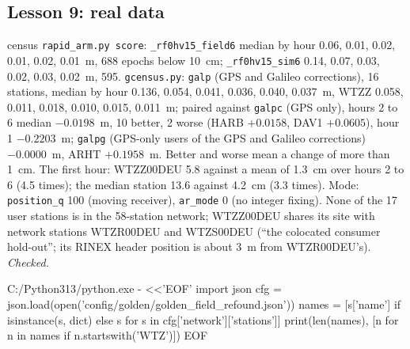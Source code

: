 \subsection*{Lesson 9: real data}

\begin{answer}{census}
\solution
\texttt{rapid\_arm.py score}: \texttt{\_rf0hv15\_field6} median by hour 0.06, 0.01, 0.02,
0.01, 0.02, 0.01~m, 688 epochs below 10~cm; \texttt{\_rf0hv15\_sim6} 0.14, 0.07, 0.03,
0.02, 0.03, 0.02~m, 595. \texttt{gcensus.py}: \texttt{galp} (GPS and Galileo
corrections), 16 stations, median by hour 0.136, 0.054, 0.041, 0.036, 0.040, 0.037~m,
WTZZ 0.058, 0.011, 0.018, 0.010, 0.015, 0.011~m; paired against \texttt{galpc} (GPS only),
hours 2 to 6 median $-0.0198$~m, 10 better, 2 worse (HARB $+0.0158$, DAV1 $+0.0605$),
hour 1 $-0.2203$~m; \texttt{galpg} (GPS-only users of the GPS and Galileo corrections)
$-0.0000$~m, ARHT $+0.1958$~m. Better and worse mean a change of more than 1~cm. The
first hour: WTZZ00DEU 5.8 against a mean of 1.3~cm over hours 2 to 6 (4.5 times); the
median station 13.6 against 4.2~cm (3.3 times). Mode: \texttt{position\_q} 100 (moving
receiver), \texttt{ar\_mode} 0 (no integer fixing). None of the 17 user stations is in
the 58-station network; WTZZ00DEU shares its site with network stations WTZR00DEU and
WTZS00DEU (``the colocated consumer hold-out''; its RINEX header position is about 3~m
from WTZR00DEU's). \emph{Checked.}
\chk
\begin{cmd}
C:/Python313/python.exe - <<'EOF'
import json
cfg = json.load(open('config/golden/golden_field_refound.json'))
names = [s['name'] if isinstance(s, dict) else s for s in cfg['network']['stations']]
print(len(names), [n for n in names if n.startswith('WTZ')])
EOF
\end{cmd}
\end{answer}

